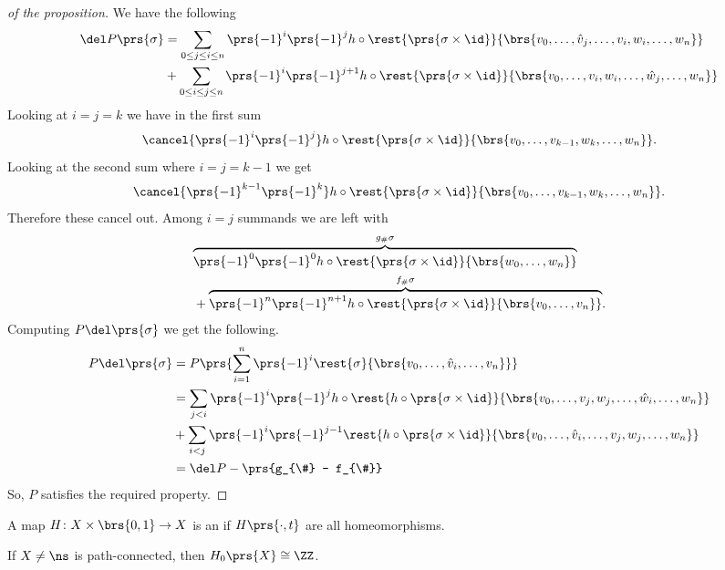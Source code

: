 \documentclass[10pt,a4paper,twoside,openany,hidelinks]{book}
\begin{document}
\begin{proof}[of the proposition]
We have the following
\begin{align*}
\del P\prs{\sigma} &= \sum_{0 \leq j \leq i \leq n} \prs{-1}^i \prs{-1}^j h \circ \rest{\prs{\sigma \times \id}}{\brs{v_0, \ldots, \hat{v}_j, \ldots, v_i, w_i, \ldots, w_n}} \\&+ \sum_{0 \leq i \leq j \leq n} \prs{-1}^i \prs{-1}^{j+1} h \circ \rest{\prs{\sigma \times \id}}{\brs{v_0, \ldots, v_i, w_i, \ldots, \hat{w}_j, \ldots, w_n}}
\end{align*}
Looking at $i=j=k$ we have in the first sum \[\cancel{\prs{-1}^i \prs{-1}^j} h\circ\rest{\prs{\sigma \times \id}}{\brs{v_0, \ldots, v_{k-1},w_k, \ldots, w_n}}\text{.}\]
Looking at the second sum where $i=j=k-1$ we get
\[\cancel{\prs{-1}^{k-1}\prs{-1}^k} h\circ\rest{\prs{\sigma \times \id}}{\brs{v_0, \ldots, v_{k-1},w_k, \ldots, w_n}}\text{.}\]
Therefore these cancel out. Among $i=j$ summands we are left with
\begin{align*}
&\overset{g_{\#}\sigma}{\overbrace{{\prs{-1}^0\prs{-1}^0} h\circ\rest{\prs{\sigma \times \id}}{\brs{w_0, \ldots, w_n}}}} \\&+ 
\overset{f_{\#}\sigma}{\overbrace{\prs{-1}^{n} \prs{-1}^{n+1} h \circ \rest{\prs{\sigma \times \id}}{\brs{v_0, \ldots, v_n}}}}\text{.}
\end{align*}
Computing $P\del \prs{\sigma}$ we get the following.
\begin{align*}
P \del \prs{\sigma} &= P\prs{\sum_{i=1}^n \prs{-1}^i \rest{\sigma}{\brs{v_0, \ldots, \hat{v}_i, \ldots, v_n}}} \\ &=
\sum_{j < i} \prs{-1}^i \prs{-1}^j h\circ \rest{h \circ \prs{\sigma \times \id}}{\brs{v_0, \ldots, v_j, w_j, \ldots, \hat{w}_i, \ldots, w_n}} \\&+
\sum_{i<j} \prs{-1}^i \prs{-1}^{j-1} \rest{h\circ \prs{\sigma \times \id}}{\brs{v_0, \ldots, \hat{v}_i, \ldots, v_j, w_j, \ldots, w_n}} \\&= \del P - \prs{g_{\#} - f_{\#}}
\end{align*}
So, $P$ satisfies the required property.
\end{proof}
\begin{definition}
A map $H \colon X\times\brs{0,1} \to X$ is an  if $H\prs{\cdot,t}$ are all homeomorphisms.
\end{definition}
\begin{proposition}
If $X\neq \ns$ is path-connected, then $H_0\prs{X} \cong \ZZ$.
\end{proposition}
\end{document}
